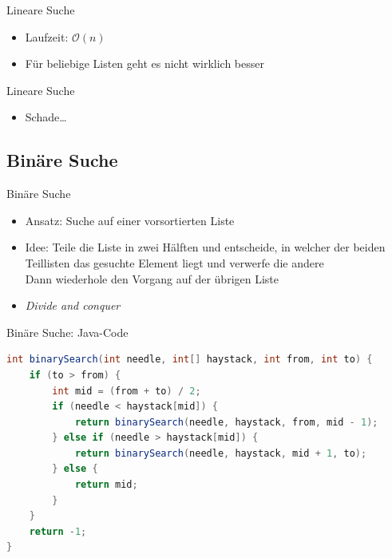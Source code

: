 \documentclass[18pt]{beamer}
\begin{document}
\begin{frame}{Lineare Suche}
    \begin{itemize}
        \item Laufzeit: $\mathcal{O}(n)$
        \item Für beliebige Listen geht es nicht wirklich besser
    \end{itemize}
\end{frame}

\begin{frame}{Lineare Suche}
    \begin{itemize}
        \item Schade\dots
    \end{itemize}
\end{frame}


\subsection{Binäre Suche}

\begin{frame}{Binäre Suche}
    \begin{itemize}
        \item Ansatz: Suche auf einer vorsortierten Liste
        \item Idee: Teile die Liste in zwei Hälften und entscheide, in welcher der beiden Teillisten das gesuchte Element liegt und verwerfe die andere\\
        Dann wiederhole den Vorgang auf der übrigen Liste
        \item \textit{Divide and conquer}
    \end{itemize}
\end{frame}

\begin{frame}[fragile]{Binäre Suche: Java-Code}
    \begin{exampleblock}{}
        \begin{lstlisting}[language=Java,basicstyle=\scriptsize,basicstyle=\scriptsize]
int binarySearch(int needle, int[] haystack, int from, int to) {
    if (to > from) {
        int mid = (from + to) / 2;
        if (needle < haystack[mid]) {
            return binarySearch(needle, haystack, from, mid - 1);
        } else if (needle > haystack[mid]) {
            return binarySearch(needle, haystack, mid + 1, to);
        } else {
            return mid;
        }
    }
    return -1;
}
        \end{lstlisting}
    \end{exampleblock}
\end{frame}
\end{document}

